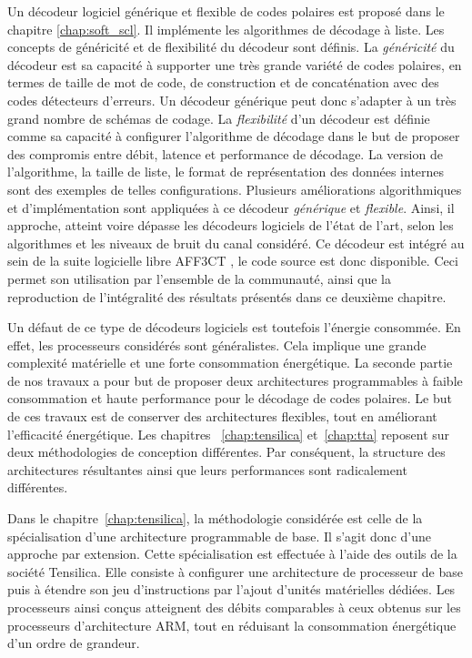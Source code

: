 Un décodeur logiciel générique et flexible de codes polaires est proposé dans le chapitre \ref{chap:soft_scl}. Il implémente les algorithmes de décodage à liste. Les concepts de généricité et de flexibilité du décodeur sont définis. La \textit{généricité} du décodeur est sa capacité à supporter une très grande variété de codes polaires, en termes de taille de mot de code, de construction et de concaténation avec des codes détecteurs d'erreurs. Un décodeur générique peut donc s'adapter à un très grand nombre de schémas de codage. La \textit{flexibilité} d'un décodeur est définie comme sa capacité à configurer l'algorithme de décodage dans le but de proposer des compromis entre débit, latence et performance de décodage. La version de l'algorithme, la taille de liste, le format de représentation des données internes sont des exemples de telles configurations. Plusieurs améliorations algorithmiques et d'implémentation sont appliquées à ce décodeur \textit{générique} et \textit{flexible}. Ainsi, il approche, atteint voire dépasse les décodeurs logiciels de l'état de l'art, selon les algorithmes et les niveaux de bruit du canal considéré. Ce décodeur est intégré au sein de la suite logicielle libre AFF3CT , le code source est donc disponible. Ceci permet son utilisation par l'ensemble de la communauté, ainsi que la reproduction de l'intégralité des résultats présentés dans ce deuxième chapitre.

Un défaut de ce type de décodeurs logiciels est toutefois l'énergie consommée. En effet, les processeurs considérés sont généralistes. Cela implique une grande complexité matérielle et une forte consommation énergétique. La seconde partie de nos travaux a pour but de proposer deux architectures programmables à faible consommation et haute performance pour le décodage de codes polaires. Le but de ces travaux est de conserver des architectures flexibles, tout en améliorant l'efficacité énergétique. Les chapitres ~\ref{chap:tensilica} et~\ref{chap:tta} reposent sur deux méthodologies de conception différentes. Par conséquent, la structure des architectures résultantes ainsi que leurs performances sont radicalement différentes.

Dans le chapitre~\ref{chap:tensilica}, la méthodologie considérée est celle de la spécialisation d'une architecture programmable de base. Il s'agit donc d'une approche par extension. Cette spécialisation est effectuée à l'aide des outils de la société Tensilica. Elle consiste à configurer une architecture de processeur de base puis à étendre son jeu d'instructions par l'ajout d'unités matérielles dédiées. Les processeurs ainsi conçus atteignent des débits comparables à ceux obtenus sur les processeurs d'architecture ARM, tout en réduisant la consommation énergétique d'un ordre de grandeur. 

